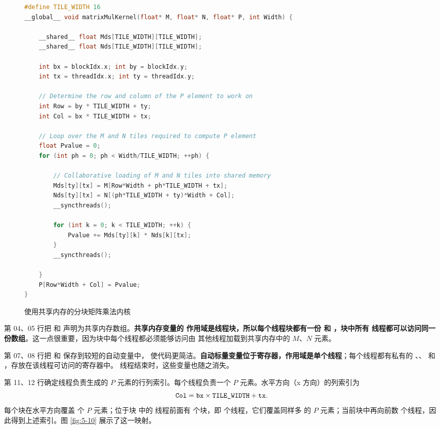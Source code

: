 \begin{figure}[htbp]
  \centering
  \begin{lstlisting}[language=C++,firstnumber=1]
#define TILE_WIDTH 16
__global__ void matrixMulKernel(float* M, float* N, float* P, int Width) {

    __shared__ float Mds[TILE_WIDTH][TILE_WIDTH];
    __shared__ float Nds[TILE_WIDTH][TILE_WIDTH];

    int bx = blockIdx.x; int by = blockIdx.y;
    int tx = threadIdx.x; int ty = threadIdx.y;

    // Determine the row and column of the P element to work on
    int Row = by * TILE_WIDTH + ty;
    int Col = bx * TILE_WIDTH + tx;

    // Loop over the M and N tiles required to compute P element
    float Pvalue = 0;
    for (int ph = 0; ph < Width/TILE_WIDTH; ++ph) {

        // Collaborative loading of M and N tiles into shared memory
        Mds[ty][tx] = M[Row*Width + ph*TILE_WIDTH + tx];
        Nds[ty][tx] = N[(ph*TILE_WIDTH + ty)*Width + Col];
        __syncthreads();

        for (int k = 0; k < TILE_WIDTH; ++k) {
            Pvalue += Mds[ty][k] * Nds[k][tx];
        }
        __syncthreads();

    }
    P[Row*Width + Col] = Pvalue;
}
  \end{lstlisting}
  \caption{使用共享内存的分块矩阵乘法内核}
  \label{fig:5-9}
\end{figure}

第 04、05 行把  和  声明为共享内存数组。\textbf{共享内存变量的
作用域是线程块，所以每个线程块都有一份  和 ，块中所有
线程都可以访问同一份数组}。这一点很重要，因为块中每个线程都必须能够访问由
其他线程加载到共享内存中的 $M$、$N$ 元素。

第 07、08 行把  和  保存到较短的自动变量中，
使代码更简洁。\textbf{自动标量变量位于寄存器，作用域是单个线程}；每个线程都有私有的
、、 和 ，存放在该线程可访问的寄存器中。
线程结束时，这些变量也随之消失。

第 11、12 行确定线程负责生成的 $P$ 元素的行列索引。每个线程负责一个 $P$
元素。水平方向（x 方向）的列索引为
\[
  \code{Col}=\code{bx}\times\code{TILE_WIDTH}+\code{tx}.
\]
每个块在水平方向覆盖  个 $P$ 元素；位于块  中的
线程前面有  个块，即  个线程，它们覆盖同样多
的 $P$ 元素；当前块中再向前数  个线程，因此得到上述索引。图
\ref{fig:5-10} 展示了这一映射。

